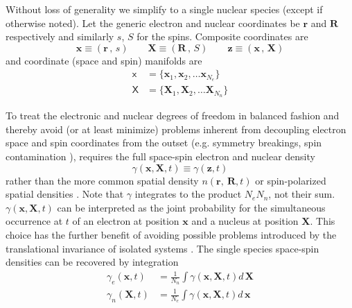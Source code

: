 \documentclass[aps,preprint]{revtex4}%
\begin{document}
Without loss of generality we simplify to a single nuclear species (except if
otherwise noted). Let the generic electron and nuclear coordinates be
$\mathbf{r}$ and $\mathbf{R}$ respectively and similarly $s$, $S$ for the
spins. Composite coordinates are
\begin{equation}
\mathbf{x} \equiv( \mathbf{r} \, , \, s ) \qquad\mathbf{X} \equiv( \mathbf{R}
\, , \, S ) \qquad\mathbf{z} \equiv( \mathbf{x} \, , \, \mathbf{X} )
\end{equation}
and coordinate (space and spin) manifolds are
\begin{align}
\mathsf{x}  &  = \{ \mathbf{x}_{1},\mathbf{x}_{2}, \ldots\mathbf{x}_{N_{e}}
\}\nonumber\\
\mathsf{X}  &  = \{ \mathbf{X}_{1},\mathbf{X}_{2}, \ldots\mathbf{X}_{N_{n}} \}
\label{manifdef}%
\end{align}


To treat the electronic and nuclear degrees of freedom in balanced fashion and
thereby avoid (or at least minimize) problems inherent from decoupling
electron space and spin coordinates from the outset (e.g. symmetry breakings,
spin contamination \cite{PerdewSavin,BLWSBT98,SavinSem2}), requires the full
space-spin electron and nuclear density
\begin{equation}
\gamma(\mathbf{x},\mathbf{X},t)\equiv\gamma(\mathbf{z},t) \label{gammadef}%
\end{equation}
rather than the more common spatial density $n(\mathbf{r},\mathbf{\ R},t)$ or
spin-polarized spatial densities \cite{spinpol}. Note that $\gamma$ integrates
to the product $N_{e}N_{n}$, not their sum. $\gamma(\mathbf{x},\mathbf{X},t)$
can be interpreted as the joint probability for the simultaneous occurrence at
$t$ of an electron at position $\mathbf{x}$ and a nucleus at position
$\mathbf{X}$. This choice has the further benefit of avoiding possible
problems introduced by the translational invariance of isolated systems
\cite{KreibGross}. The single species space-spin densities can be recovered by
integration
\begin{align}
\gamma_{e}(\mathbf{x},t)  &  =\frac{1}{N_{n}}\int\gamma(\mathbf{x}%
,\mathbf{X},t)d\,\mathbf{X}\nonumber\\
\gamma_{n}(\mathbf{X},t)  &  =\frac{1}{N_{e}}\int\gamma(\mathbf{x}%
,\mathbf{X},t)d\,\mathbf{x}%
\end{align}
\end{document}
